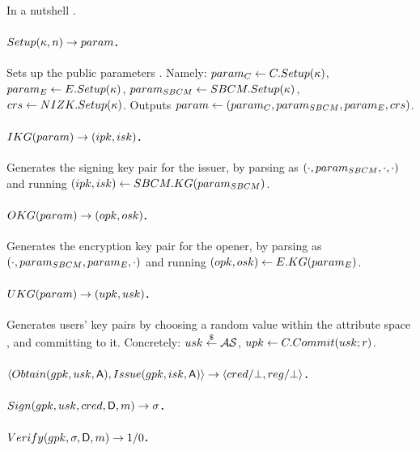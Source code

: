 In a nutshell .

\paragraph{$Setup(\kappa,n) \rightarrow param$.} %
Sets up the public parameters . Namely: $param_C \gets C.Setup(\kappa)$, $param_{E} \gets
E.Setup(\kappa)$, $param_{SBCM} \gets SBCM.Setup(\kappa)$, $crs \gets
NIZK.Setup(\kappa)$. Outputs $param \gets (param_C,param_{SBCM},param_{E},crs)$.

\paragraph{$IKG(param) \rightarrow (ipk,isk)$.} %
Generates the signing key pair for the issuer, by parsing \parm as
$(\cdot,param_{SBCM},\cdot,\cdot)$ and running $(ipk,isk) \gets
SBCM.KG(param_{SBCM})$.

\paragraph{$OKG(param) \rightarrow (opk,osk)$.} %
Generates the encryption key pair for the opener, by parsing \parm as
$(\cdot,param_{SBCM},param_{E},\cdot)$ and running $(opk,osk) \gets
E.KG(param_{E})$.

\paragraph{$UKG(param) \rightarrow (upk,usk)$.} %
Generates users' key pairs by choosing a random value within the attribute space
\AttrSpace, and committing to it. Concretely: $usk \stackrel{\$}{\gets} \mathcal{AS}$, $upk
\gets C.Commit(usk; r)$.

\paragraph{$\langle Obtain(gpk,usk,\mathsf{A}),Issue(gpk,isk,\mathsf{A}) \rangle
  \rightarrow \langle cred/\bot,reg/\bot \rangle$.} %

\paragraph{$Sign(gpk,usk,cred,\mathsf{D},m) \rightarrow \sigma$.} %

\paragraph{$Verify(gpk,\sigma,\mathsf{D},m) \rightarrow 1/0$.} %


